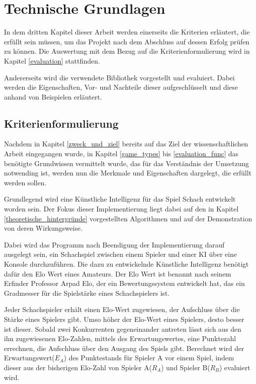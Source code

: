 
\chapter{Technische Grundlagen}
In dem dritten Kapitel dieser Arbeit werden einerseits die Kriterien erläutert, die erfüllt sein müssen, um das Projekt nach dem Abschluss auf dessen Erfolg prüfen zu können. Die Auswertung mit dem Bezug auf die Kriterienformulierung wird in Kapitel \ref{evaluation} stattfinden.

Andererseits wird die verwendete Bibliothek vorgestellt und evaluiert. Dabei werden die Eigenschaften, Vor- und Nachteile dieser aufgeschlüsselt und diese anhand von Beispielen erläutert.


\section{Kriterienformulierung}\label{kriterienformulierung}
Nachdem in Kapitel \ref{zweck_und_ziel} bereits auf das Ziel der wissenschaftlichen Arbeit eingegangen wurde, in Kapitel \ref{game_types} bis \ref{evaluation_func} das benötigte Grundwissen vermittelt wurde, das für das Verständnis der Umsetzung notwending ist, werden nun die Merkmale und Eigenschaften dargelegt, die erfüllt werden sollen.

Grundlegend wird eine Künstliche Intelligenz für das Spiel Schach entwickelt worden sein. Der Fokus dieser Implementierung liegt dabei auf den in Kapitel \ref{theoretische_hintergründe} vorgestellten Algorithmen und auf der Demonstration von deren Wirkungsweise.

Dabei wird das Programm nach Beendigung der Implementierung darauf ausgelegt sein, ein Schachspiel zwischen einem Spieler und einer KI über eine Konsole durchzuführen. Die dazu zu entwickelnde Künstliche Intelligenz benötigt dafür den Elo Wert eines Amateurs. Der Elo Wert ist benannt nach seinem Erfinder Professor Arpad Elo, der ein Bewertungssystem entwickelt hat, das ein Gradmesser für die Spielstärke eines Schachspielers ist.\cite{E.V.} 

Jeder Schachspieler erhält einen Elo-Wert zugewiesen, der Aufschluss über die Stärke eines Spielers gibt. Umso höher der Elo-Wert eines Spielers, desto besser ist dieser. Sobald zwei Konkurrenten gegeneinander antreten lässt sich aus den ihn zugewiesenen Elo-Zahlen, mittels des Erwartungswertes, eine Punktezahl errechnen, die Aufschluss über den Ausgang des Spiels gibt. 
Berechnet wird der Erwartungswert($E_{A}$) des Punktestands für Spieler A vor einem Spiel, indem dieser aus der bisherigen Elo-Zahl von Spieler A($R_{A}$) und Spieler B($R_{B}$) evaluiert wird.

